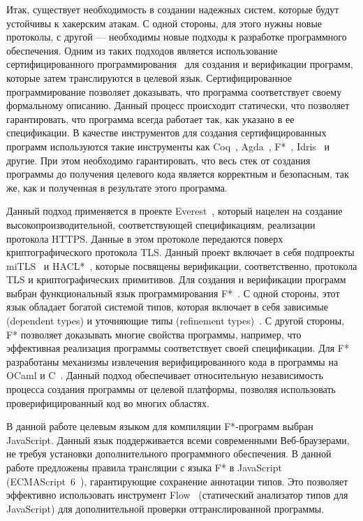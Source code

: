 \documentclass[12pt]{matmex-diploma}
\begin{document}
Итак, существует необходимость в создании надежных систем, которые будут устойчивы к хакерским атакам. С одной стороны, для этого нужны новые протоколы, с другой --- необходимы новые подходы к разработке программного обеспечения. Одним из таких подходов является использование сертифицированного программирования~\cite{certifiedProgramming} для создания и верификации программ, которые затем транслируются в целевой язык. Сертифицированное программирование позволяет доказывать, что программа соответствует своему формальному описанию. Данный процесс происходит статически, что позволяет гарантировать, что программа всегда работает так, как указано в ее спецификации. В качестве инструментов для создания сертифицированных программ используются такие инструменты как Coq~\cite{coq}, Agda~\cite{agda}, F*~\cite{fstar}, Idris~\cite{idris} и другие.  При этом необходимо гарантировать, что весь стек от создания программы до получения целевого кода является корректным и безопасным, так же, как и полученная в результате этого программа. 

Данный подход применяется в проекте Everest~\cite{everest}, который нацелен на создание высокопроизводительной, соответствующей спецификациям, реализации протокола HTTPS. Данные в этом протоколе передаются поверх криптографического протокола TLS. Данный проект включает в себя подпроекты miTLS~\cite{mitls} и HACL*~\cite{hacl_star}, которые посвящены верификации, соответственно, протокола TLS и криптографических примитивов. Для создания и верификации программ выбран функциональный язык программирования F*~\cite{fstarCite}. С одной стороны, этот язык обладает богатой системой типов, которая включает в себя зависимые (dependent types) и уточняющие типы (refinement types)~\cite{certifiedProgramming}. С другой стороны, F* позволяет доказывать многие свойства программы, например, что эффективная реализация программы соответствует своей спецификации. Для F* разработаны механизмы извлечения верифицированного кода в программы на OCaml и C~\cite{kremlin}. Данный подход обеспечивает относительную независимость процесса создания программы от целевой платформы, позволяя использовать проверифицированный код во многих областях. 

В данной работе целевым языком для компиляции F*-программ выбран JavaScript. Данный язык поддерживается всеми современными Веб-браузерами, не требуя установки дополнительного программного обеспечения. В данной работе предложены правила трансляции с языка F* в JavaScript (ECMAScript~6~\cite{specjs}), гарантирующие сохранение аннотации типов. Это позволяет эффективно использовать инструмент Flow~\cite{flow} (статический анализатор типов для JavaScript) для дополнительной проверки оттранслированной программы. %
\end{document}
